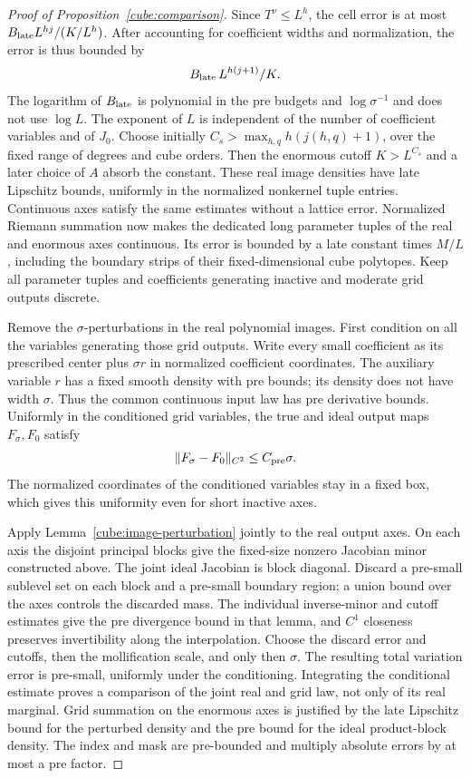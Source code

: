 \begin{proof}[Proof of Proposition~\ref{cube:comparison}]
Since $T^\nu\le L^h$, the cell error is at most
$B_{\rm late}L^{hj}/(K/L^h)$.  After accounting for coefficient
widths and normalization, the error is thus bounded by
\[
                 B_{\rm late}\,L^{h(j+1)}/K.
\]
The logarithm of $B_{\rm late}$ is polynomial in the pre budgets
and $\log\sigma^{-1}$ and does not use $\log L$.  The exponent of
$L$ is independent of the number of coefficient variables and of
$J_0$.  Choose initially
$C_s>\max_{h,q}h(j(h,q)+1)$, over the fixed range of degrees and
cube orders.  Then the enormous cutoff $K>L^{C_s}$ and a later
choice of $A$ absorb the constant.  These real image
densities have late Lipschitz bounds, uniformly in the normalized
nonkernel tuple entries.  Continuous axes satisfy the same estimates
without a lattice error.  Normalized Riemann summation now makes
the dedicated long parameter tuples of the real and enormous axes
continuous.  Its error is bounded by a late constant times $M/L$,
including the boundary strips of their fixed-dimensional cube
polytopes.  Keep all parameter tuples and coefficients generating
inactive and moderate grid outputs discrete.

Remove the $\sigma$-perturbations in the real polynomial images.
First condition on all the variables generating those grid outputs.
Write every small coefficient as its prescribed center plus
$\sigma r$ in normalized coefficient coordinates.  The auxiliary
variable $r$ has a fixed smooth density with pre bounds; its density
does not have width $\sigma$.  Thus the common continuous input law
has pre derivative bounds.  Uniformly in the conditioned grid
variables, the true and ideal output maps $F_\sigma,F_0$ satisfy
\[
                 \|F_\sigma-F_0\|_{C^2}\le C_{\rm pre}\sigma.
\]
The normalized coordinates of the conditioned variables stay in a
fixed box, which gives this uniformity even for short inactive axes.

Apply Lemma~\ref{cube:image-perturbation} jointly to the real output
axes.  On each axis the disjoint principal blocks give the fixed-size
nonzero Jacobian minor constructed above.  The joint ideal Jacobian
is block diagonal.  Discard a pre-small sublevel set on each block and
a pre-small boundary region; a union bound over the axes controls the
discarded mass.  The individual inverse-minor and cutoff estimates
give the pre divergence bound in that lemma, and $C^1$ closeness
preserves invertibility along the interpolation.  Choose the discard
error and cutoffs, then the mollification scale, and only then
$\sigma$.  The resulting total variation error is pre-small,
uniformly under the conditioning.  Integrating the conditional
estimate proves a comparison of the joint real and grid law, not
only of its real marginal.  Grid summation on the enormous axes is
justified by the late Lipschitz bound for the perturbed density and
the pre bound for the ideal product-block density.  The index and
mask are pre-bounded and multiply absolute errors by at most a pre
factor.


\end{proof}
